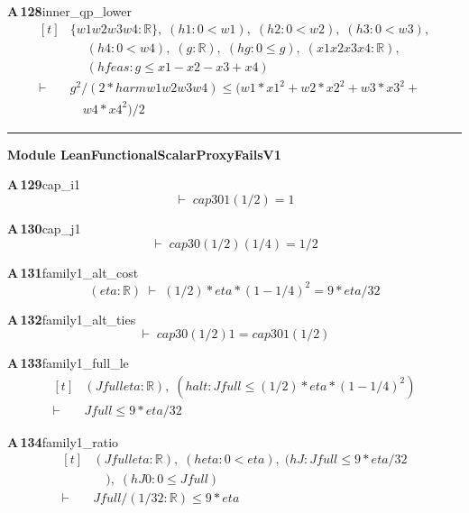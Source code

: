 \documentclass[conference]{IEEEtran}
\theoremstyle{definition}
\newcommand{\lean}[1]{\textsf{\footnotesize #1}}
\begin{document}
\noindent\textbf{A\,128}\quad\lean{inner\_qp\_lower}
{\footnotesize\[ \begin{aligned}[t]
&\{ \mathit{w1} \mathit{w2} \mathit{w3} \mathit{w4} : \mathbb{R} \},\; (\mathit{h1} : 0 < \mathit{w1}),\; (\mathit{h2} : 0 < \mathit{w2}),\; (\mathit{h3} : 0 < \mathit{w3}),\\
&\quad \; (\mathit{h4} : 0 < \mathit{w4}),\; (\mathit{g} : \mathbb{R} ),\; (\mathit{hg} : 0 \leq \mathit{g}),\; (\mathit{x1} \mathit{x2} \mathit{x3} \mathit{x4} : \mathbb{R} ),\\
&\quad \; (\mathit{hfeas} : \mathit{g} \leq \mathit{x1} - \mathit{x2} - \mathit{x3} + \mathit{x4})\\
\vdash\;&\mathit{g} ^{2} / (2 * \mathit{harm} \mathit{w1} \mathit{w2} \mathit{w3} \mathit{w4}) \leq (\mathit{w1}*\mathit{x1}^{2} + \mathit{w2}*\mathit{x2}^{2} + \mathit{w3}*\mathit{x3}^{2} +\\
&\quad \mathit{w4}*\mathit{x4}^{2}) / 2
\end{aligned} \]}

\vspace{4pt}\noindent\rule{\columnwidth}{0.4pt}\par\vspace{2pt}
\noindent\textbf{Module \lean{LeanFunctionalScalarProxyFailsV1}}\par\vspace{3pt}

\noindent\textbf{A\,129}\quad\lean{cap\_i1}
{\footnotesize\[ \vdash\; \mathit{cap3} 0 1 (1/2) = 1 \]}

\noindent\textbf{A\,130}\quad\lean{cap\_j1}
{\footnotesize\[ \vdash\; \mathit{cap3} 0 (1/2) (1/4) = 1/2 \]}

\noindent\textbf{A\,131}\quad\lean{family1\_alt\_cost}
{\footnotesize\[ (\mathit{eta} : \mathbb{R} ) \;\vdash\; (1/2) * \mathit{eta} * (1 - 1/4) ^{2} = 9 * \mathit{eta} / 32 \]}

\noindent\textbf{A\,132}\quad\lean{family1\_alt\_ties}
{\footnotesize\[ \vdash\; \mathit{cap3} 0 (1/2) 1 = \mathit{cap3} 0 1 (1/2) \]}

\noindent\textbf{A\,133}\quad\lean{family1\_full\_le}
{\footnotesize\[ \begin{aligned}[t]
&(\mathit{Jfull} \mathit{eta} : \mathbb{R} ),\; (\mathit{halt} : \mathit{Jfull} \leq (1/2) * \mathit{eta} * (1 - 1/4) ^{2})\\
\vdash\;&\mathit{Jfull} \leq 9 * \mathit{eta} / 32
\end{aligned} \]}

\noindent\textbf{A\,134}\quad\lean{family1\_ratio}
{\footnotesize\[ \begin{aligned}[t]
&(\mathit{Jfull} \mathit{eta} : \mathbb{R} ),\; (\mathit{heta} : 0 < \mathit{eta}),\; (\mathit{hJ} : \mathit{Jfull} \leq 9 * \mathit{eta} / 32\\
&\quad ),\; (\mathit{hJ0} : 0 \leq \mathit{Jfull})\\
\vdash\;&\mathit{Jfull} / (1 / 32 : \mathbb{R} ) \leq 9 * \mathit{eta}
\end{aligned} \]}
\end{document}
